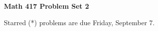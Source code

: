\documentclass[12pt]{article}
\begin{document}
\def\ctln{\centerline}
\def\msk{\medskip}
\def\bsk{\bigskip}
\def\ssk{\smallskip}
\def\hsk{\hskip.3in}
\def\ra{\rightarrow}
\def\ubr{\underbar}

\def\mt{{\mathcal T}}
\def\mb{{\mathcal B}}
\def\ms{{\mathcal S}}
\def\mu{{\mathcal U}}
\def\mv{{\mathcal V}}

\def\bbr{{\mathbb R}}
\def\bbz{{\mathbb Z}}
\def\spc{$~$\hskip.15in$~$}

\def\sset{\subseteq}
\def\del{\partial}
\def\lra{$\Leftrightarrow$}
\def\bra{$\Rightarrow$}




\ctln{\bf Math 417 Problem Set 2}

\msk

Starred (*) problems are due Friday, September 7.
\end{document}
